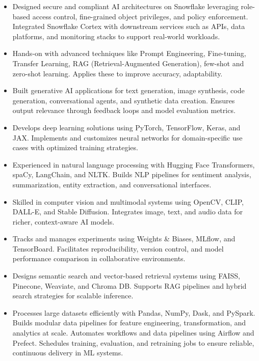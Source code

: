 \begin{itemize}
  \item Designed secure and compliant AI architectures on Snowflake leveraging role-based access
        control, fine-grained object privileges, and policy enforcement. Integrated Snowflake Cortex
        with downstream services such as APIs, data platforms, and monitoring stacks to support
        real-world workloads.

  \item Hands-on with advanced techniques like Prompt Engineering, Fine-tuning, Transfer Learning,
        RAG (Retrieval-Augmented Generation), few-shot and zero-shot learning. Applies these to
        improve accuracy, adaptability.

  \item Built generative AI applications for text generation, image synthesis, code generation,
        conversational agents, and synthetic data creation. Ensures output relevance through feedback
        loops and model evaluation metrics.

  \item Develops deep learning solutions using PyTorch, TensorFlow, Keras, and JAX. Implements and
        customizes neural networks for domain-specific use cases with optimized training strategies.

  \item Experienced in natural language processing with Hugging Face Transformers, spaCy, LangChain,
        and NLTK. Builds NLP pipelines for sentiment analysis, summarization, entity extraction, and
        conversational interfaces.

  \item Skilled in computer vision and multimodal systems using OpenCV, CLIP, DALL-E, and Stable
        Diffusion. Integrates image, text, and audio data for richer, context-aware AI models.

  \item Tracks and manages experiments using Weights \& Biases, MLflow, and TensorBoard. Facilitates
        reproducibility, version control, and model performance comparison in collaborative
        environments.

  \item Designs semantic search and vector-based retrieval systems using FAISS, Pinecone, Weaviate,
        and Chroma DB. Supports RAG pipelines and hybrid search strategies for scalable inference.

  \item Processes large datasets efficiently with Pandas, NumPy, Dask, and PySpark. Builds modular
        data pipelines for feature engineering, transformation, and analytics at scale. Automates
        workflows and data pipelines using Airflow and Prefect. Schedules training, evaluation, and
        retraining jobs to ensure reliable, continuous delivery in ML systems.


\end{itemize}
